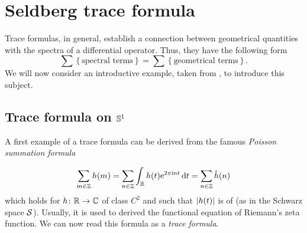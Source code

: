 
\chapter{Seldberg trace formula} %

\label{Chapter4} %
\thispagestyle{empty}

Trace formulas, in general, establish a connection between geometrical quantities with the spectra of a differential operator. Thus, they have the following form
\[
\sum\left\{
\text{spectral terms}
\right\}
=
\sum\left\{
\text{geometrical terms}
\right\}.
\]
We will now consider an introductive example, taken from \cite{Markloff:article}, to introduce this subject.

\section{Trace formula on $\S^{1}$}


\label{sec:intro_trace_for_s1}
A first example of a trace formula can be derived from the famous \emph{Poisson summation formula}

\begin{equation}
\label{eq:poisson_summation_formula}
\sum_{m\in\Z}h(m)=\sum_{n\in\Z}\int_{\R}h(t)\e^{2\pi\imi nt}\dd t=\sum_{n\in\Z}\Four{h}(n)
\end{equation}
which holds for $h\colon\R\to\mathbb{C}$ of class $C^{2}$ and such that $\abs{h(t)}$ is of  (as in the Schwarz space $\schwarz$). Usually, it is used to derived the functional equation of Riemann's zeta function. We can now read this formula as a \emph{trace formula}.\\

